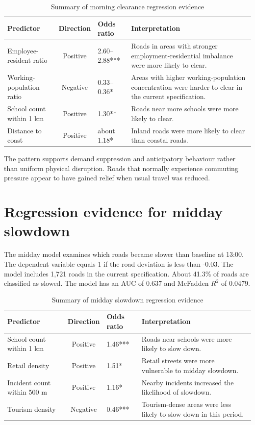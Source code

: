 \documentclass[12pt,a4paper]{report}
\begin{document}
\begin{table}[H]
\centering
\caption{Summary of morning clearance regression evidence}
\begin{tabularx}{\textwidth}{lclX}
\toprule
Predictor & Direction & Odds ratio & Interpretation \\
\midrule
Employee-resident ratio & Positive & 2.60--2.88*** & Roads in areas with stronger employment-residential imbalance were more likely to clear. \\
Working-population ratio & Negative & 0.33--0.36* & Areas with higher working-population concentration were harder to clear in the current specification. \\
School count within 1 km & Positive & 1.30** & Roads near more schools were more likely to clear. \\
Distance to coast & Positive & about 1.18* & Inland roads were more likely to clear than coastal roads. \\
\bottomrule
\end{tabularx}
\end{table}

The pattern supports demand suppression and anticipatory behaviour rather than uniform physical disruption. Roads that normally experience commuting pressure appear to have gained relief when usual travel was reduced.

\section{Regression evidence for midday slowdown}
The midday model examines which roads became slower than baseline at 13:00. The dependent variable equals 1 if the road deviation is less than -0.03. The model includes 1,721 roads in the current specification. About 41.3\% of roads are classified as slowed. The model has an AUC of 0.637 and McFadden $R^2$ of 0.0479.

\begin{table}[H]
\centering
\caption{Summary of midday slowdown regression evidence}
\begin{tabularx}{\textwidth}{lclX}
\toprule
Predictor & Direction & Odds ratio & Interpretation \\
\midrule
School count within 1 km & Positive & 1.46*** & Roads near schools were more likely to slow down. \\
Retail density & Positive & 1.51* & Retail streets were more vulnerable to midday slowdown. \\
Incident count within 500 m & Positive & 1.16* & Nearby incidents increased the likelihood of slowdown. \\
Tourism density & Negative & 0.46*** & Tourism-dense areas were less likely to slow down in this period. \\
\bottomrule
\end{tabularx}
\end{table}
\end{document}
